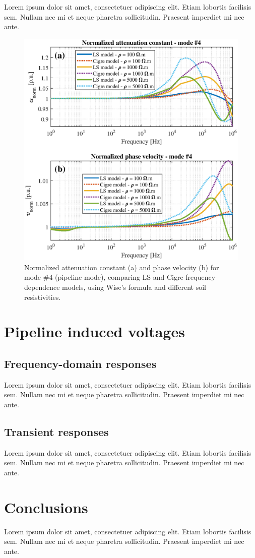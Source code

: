 \documentclass[lettersize,journal]{IEEEtran}
\newcommand*{\shortblindtext}{Lorem ipsum dolor sit amet, consectetuer adipiscing elit. Etiam lobortis facilisis sem. Nullam nec mi et neque pharetra sollicitudin. Praesent imperdiet mi nec ante.}
\begin{document}
\shortblindtext
\begin{figure}[tbh]
	\centering
	\label{fig:WiSoilModel_ratio_mode4}
	\includegraphics[width=1\columnwidth]{./fig/WiSoilModel_ratio_mode4.eps}
	\caption{Normalized attenuation constant (a) and phase velocity (b) for mode \#4 (pipeline mode), comparing LS and Cigre frequency-dependence models, using Wise's formula and different soil resistivities.}
\end{figure}

\section{Pipeline induced voltages}

\subsection{Frequency-domain responses}
\shortblindtext

\subsection{Transient responses}
\shortblindtext

\section{Conclusions}
\shortblindtext
\end{document}
